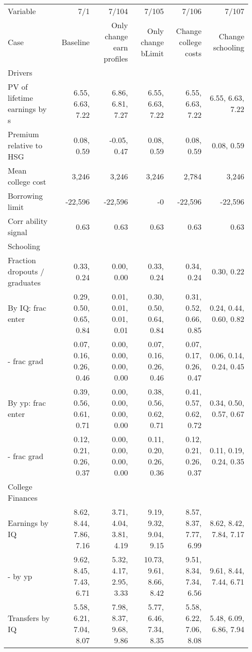 \begin{tabular}{lrrrrr}
\hline
Variable & 7/1  & 7/104  & 7/105  & 7/106  & 7/107  \\ 
Case & Baseline  & Only change earn profiles  & Only change bLimit  & Change college costs  & Change schooling  \\ 
Drivers &   &   &   &   &   \\ 
PV of lifetime earnings by s & 6.55, 6.63, 7.22  & 6.86, 6.81, 7.27  & 6.55, 6.63, 7.22  & 6.55, 6.63, 7.22  & 6.55, 6.63, 7.22  \\ 
Premium relative to HSG & 0.08, 0.59  & -0.05, 0.47  & 0.08, 0.59  & 0.08, 0.59  & 0.08, 0.59  \\ 
Mean college cost & 3,246  & 3,246  & 3,246  & 2,784  & 3,246  \\ 
Borrowing limit & -22,596  & -22,596  & -0  & -22,596  & -22,596  \\ 
Corr ability signal & 0.63  & 0.63  & 0.63  & 0.63  & 0.63  \\ 
\hline
Schooling &   &   &   &   &   \\ 
Fraction dropouts / graduates & 0.33, 0.24  & 0.00, 0.00  & 0.33, 0.24  & 0.34, 0.24  & 0.30, 0.22  \\ 
By IQ: frac enter & 0.29, 0.50, 0.65, 0.84  & 0.01, 0.01, 0.01, 0.01  & 0.30, 0.50, 0.64, 0.84  & 0.31, 0.52, 0.66, 0.85  & 0.24, 0.44, 0.60, 0.82  \\ 
- frac grad & 0.07, 0.16, 0.26, 0.46  & 0.00, 0.00, 0.00, 0.00  & 0.07, 0.16, 0.26, 0.46  & 0.07, 0.17, 0.26, 0.47  & 0.06, 0.14, 0.24, 0.45  \\ 
By yp: frac enter & 0.39, 0.56, 0.61, 0.71  & 0.00, 0.00, 0.00, 0.00  & 0.38, 0.56, 0.62, 0.71  & 0.41, 0.57, 0.62, 0.72  & 0.34, 0.50, 0.57, 0.67  \\ 
- frac grad & 0.12, 0.21, 0.26, 0.37  & 0.00, 0.00, 0.00, 0.00  & 0.11, 0.20, 0.26, 0.36  & 0.12, 0.21, 0.26, 0.37  & 0.11, 0.19, 0.24, 0.35  \\ 
\hline
College Finances &   &   &   &   &   \\ 
Earnings by IQ & 8.62, 8.44, 7.86, 7.16  & 3.71, 4.04, 3.81, 4.19  & 9.19, 9.32, 9.04, 9.15  & 8.57, 8.37, 7.77, 6.99  & 8.62, 8.42, 7.84, 7.17  \\ 
- by yp & 9.62, 8.45, 7.43, 6.71  & 5.32, 4.17, 2.95, 3.33  & 10.73, 9.61, 8.66, 8.42  & 9.51, 8.34, 7.34, 6.56  & 9.61, 8.44, 7.44, 6.71  \\ 
Transfers by IQ & 5.58, 6.21, 7.04, 8.07  & 7.98, 8.37, 9.68, 9.86  & 5.77, 6.46, 7.34, 8.35  & 5.58, 6.22, 7.06, 8.08  & 5.48, 6.09, 6.86, 7.94  \\ 

\end{tabular}
